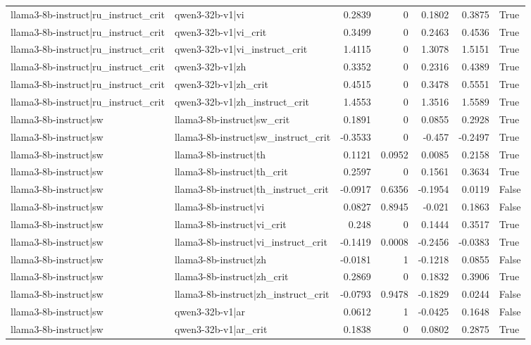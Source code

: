 \begin{table}
\begin{tabular}{l l r r r r l}
llama3-8b-instruct|ru_instruct_crit & qwen3-32b-v1|vi & 0.2839 & 0 & 0.1802 & 0.3875 & True \\
llama3-8b-instruct|ru_instruct_crit & qwen3-32b-v1|vi_crit & 0.3499 & 0 & 0.2463 & 0.4536 & True \\
llama3-8b-instruct|ru_instruct_crit & qwen3-32b-v1|vi_instruct_crit & 1.4115 & 0 & 1.3078 & 1.5151 & True \\
llama3-8b-instruct|ru_instruct_crit & qwen3-32b-v1|zh & 0.3352 & 0 & 0.2316 & 0.4389 & True \\
llama3-8b-instruct|ru_instruct_crit & qwen3-32b-v1|zh_crit & 0.4515 & 0 & 0.3478 & 0.5551 & True \\
llama3-8b-instruct|ru_instruct_crit & qwen3-32b-v1|zh_instruct_crit & 1.4553 & 0 & 1.3516 & 1.5589 & True \\
llama3-8b-instruct|sw & llama3-8b-instruct|sw_crit & 0.1891 & 0 & 0.0855 & 0.2928 & True \\
llama3-8b-instruct|sw & llama3-8b-instruct|sw_instruct_crit & -0.3533 & 0 & -0.457 & -0.2497 & True \\
llama3-8b-instruct|sw & llama3-8b-instruct|th & 0.1121 & 0.0952 & 0.0085 & 0.2158 & True \\
llama3-8b-instruct|sw & llama3-8b-instruct|th_crit & 0.2597 & 0 & 0.1561 & 0.3634 & True \\
llama3-8b-instruct|sw & llama3-8b-instruct|th_instruct_crit & -0.0917 & 0.6356 & -0.1954 & 0.0119 & False \\
llama3-8b-instruct|sw & llama3-8b-instruct|vi & 0.0827 & 0.8945 & -0.021 & 0.1863 & False \\
llama3-8b-instruct|sw & llama3-8b-instruct|vi_crit & 0.248 & 0 & 0.1444 & 0.3517 & True \\
llama3-8b-instruct|sw & llama3-8b-instruct|vi_instruct_crit & -0.1419 & 0.0008 & -0.2456 & -0.0383 & True \\
llama3-8b-instruct|sw & llama3-8b-instruct|zh & -0.0181 & 1 & -0.1218 & 0.0855 & False \\
llama3-8b-instruct|sw & llama3-8b-instruct|zh_crit & 0.2869 & 0 & 0.1832 & 0.3906 & True \\
llama3-8b-instruct|sw & llama3-8b-instruct|zh_instruct_crit & -0.0793 & 0.9478 & -0.1829 & 0.0244 & False \\
llama3-8b-instruct|sw & qwen3-32b-v1|ar & 0.0612 & 1 & -0.0425 & 0.1648 & False \\
llama3-8b-instruct|sw & qwen3-32b-v1|ar_crit & 0.1838 & 0 & 0.0802 & 0.2875 & True \\

\end{tabular}
\end{table}
